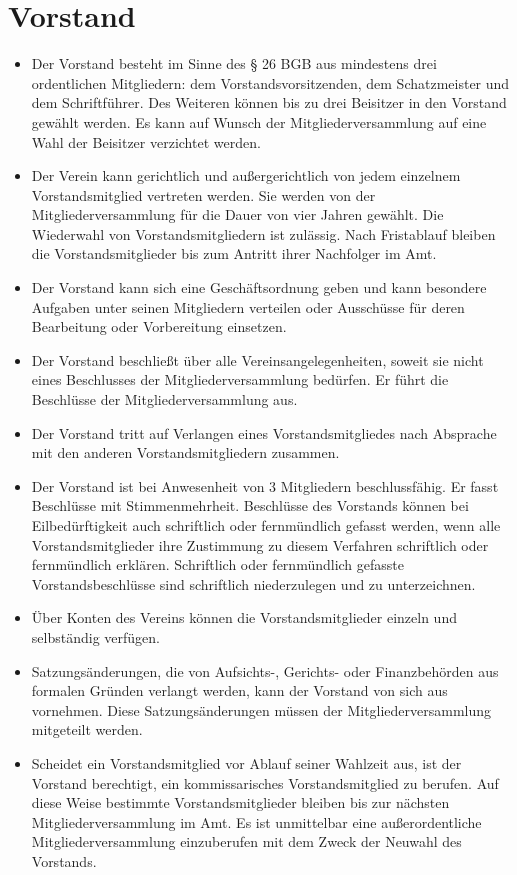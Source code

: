 \documentclass[a4paper,10pt]{article}
\begin{document}
\section{Vorstand}
  \begin{itemize}
   \item Der Vorstand besteht im Sinne des § 26 BGB aus mindestens drei ordentlichen Mitgliedern: dem Vorstandsvorsitzenden, dem Schatzmeister und dem Schriftführer. Des Weiteren können bis zu drei Beisitzer in den Vorstand gewählt werden. Es kann auf Wunsch der Mitgliederversammlung auf eine Wahl der Beisitzer verzichtet werden.
   \item Der Verein kann gerichtlich und außergerichtlich von jedem einzelnem Vorstandsmitglied vertreten werden. Sie werden von der Mitgliederversammlung für die Dauer von vier Jahren gewählt. Die Wiederwahl von Vorstandsmitgliedern ist zulässig. Nach Fristablauf bleiben die Vorstandsmitglieder bis zum Antritt ihrer Nachfolger im Amt. 
   \item Der Vorstand kann sich eine Geschäftsordnung geben und kann besondere Aufgaben unter seinen Mitgliedern verteilen oder Ausschüsse für deren Bearbeitung oder Vorbereitung einsetzen. 
   \item Der Vorstand beschließt über alle Vereinsangelegenheiten, soweit sie nicht eines Beschlusses der Mitgliederversammlung bedürfen. Er führt die Beschlüsse der Mitgliederversammlung aus. 
   \item Der Vorstand tritt auf Verlangen eines Vorstandsmitgliedes nach Absprache mit den anderen Vorstandsmitgliedern zusammen. 
   \item Der Vorstand ist bei Anwesenheit von 3 Mitgliedern beschlussfähig. Er fasst Beschlüsse mit Stimmenmehrheit. Beschlüsse des Vorstands können bei Eilbedürftigkeit auch schriftlich oder fernmündlich gefasst werden, wenn alle Vorstandsmitglieder ihre Zustimmung zu diesem Verfahren schriftlich oder fernmündlich erklären. Schriftlich oder fernmündlich gefasste Vorstandsbeschlüsse sind schriftlich niederzulegen und zu unterzeichnen. 
   \item Über Konten des Vereins können die Vorstandsmitglieder einzeln und selbständig verfügen. 
   \item Satzungsänderungen, die von Aufsichts-, Gerichts- oder Finanzbehörden aus formalen Gründen verlangt werden, kann der Vorstand von sich aus vornehmen. Diese Satzungsänderungen müssen der Mitgliederversammlung mitgeteilt werden. 
   \item Scheidet ein Vorstandsmitglied vor Ablauf seiner Wahlzeit aus, ist der Vorstand berechtigt, ein kommissarisches Vorstandsmitglied zu berufen. Auf diese Weise bestimmte Vorstandsmitglieder bleiben bis zur nächsten Mitgliederversammlung im Amt. Es ist unmittelbar eine außerordentliche Mitgliederversammlung einzuberufen mit dem Zweck der Neuwahl des Vorstands. 

\end{itemize}
\end{document}
